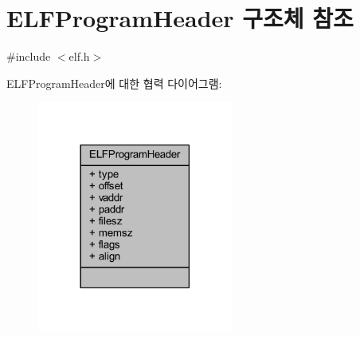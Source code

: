 \hypertarget{struct_e_l_f_program_header}{}\section{E\+L\+F\+Program\+Header 구조체 참조}
\label{struct_e_l_f_program_header}


{\ttfamily \#include $<$elf.\+h$>$}



E\+L\+F\+Program\+Header에 대한 협력 다이어그램\+:\nopagebreak
\begin{figure}[H]
\begin{center}
\leavevmode
\includegraphics[width=182pt]{struct_e_l_f_program_header__coll__graph}
\end{center}
\end{figure}
